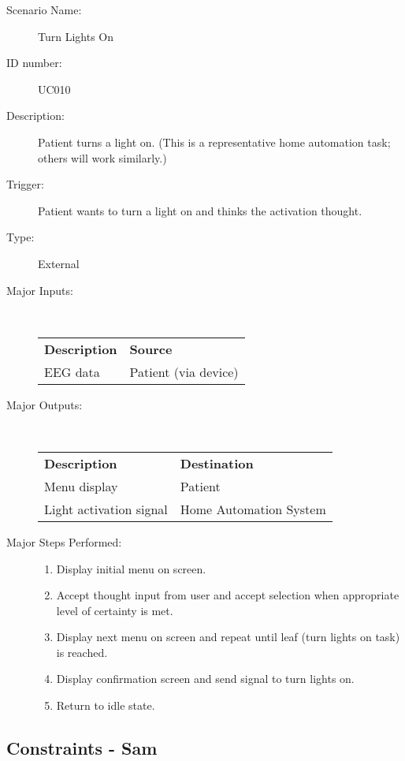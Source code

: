 \documentclass{article}
\begin{document}
\begin{description}
    \item[Scenario Name:] Turn Lights On
    \item[ID number:] UC010
    \item[Description:] Patient turns a light on. (This is a representative
        home automation task; others will work similarly.)
    \item[Trigger:] Patient wants to turn a light on and thinks the activation thought.
    \item[Type:] External
    \item[Major Inputs:] \hfill \\
        \begin{tabular}{l l}
            \textbf{Description} & \textbf{Source} \\
            EEG data & Patient (via device) \\
        \end{tabular}
    \item[Major Outputs:] \hfill \\
        \begin{tabular}{l l}
            \textbf{Description} & \textbf{Destination} \\
            Menu display & Patient \\
            Light activation signal & Home Automation System
        \end{tabular}
    \item[Major Steps Performed:] \hfill
        \begin{enumerate}
            \item Display initial menu on screen.
            \item Accept thought input from user and accept selection when
                appropriate level of certainty is met.
            \item Display next menu on screen and repeat until leaf (turn
                lights on task) is reached.
            \item Display confirmation screen and send signal to turn lights
                on.
            \item Return to idle state.
        \end{enumerate}
\end{description}

\subsection{Constraints - Sam}
\end{document}

